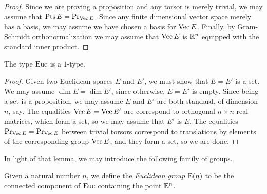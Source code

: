 \begin{proof}
  Since we are proving a proposition and any torsor is merely trivial, we may
  assume that $\operatorname{Pts} E = \mathrm{Pr}_{{\operatorname{Vec} E}}$.  Since any finite dimensional
  vector space merely has a basis, we may assume we have chosen a basis for
  $\operatorname{Vec} E$.  Finally, by Gram-Schmidt orthonormalization we may assume that
  $\operatorname{Vec} E$ is $\mathbb{R}^n$ equipped with the standard inner product.
\end{proof}

\begin{lemma}\label{lem:EuclideanSpace1Type}
  The type $\mathrm{Euc}$ is a $1$-type.
\end{lemma}

\begin{proof}
  Given two Euclidean spaces $E$ and $E'$, we must show that $E=E'$ is a set.
  We may assume $\dim E = \dim E'$, since otherwise, $E=E'$ is empty.  Since
  being a set is a proposition, we may assume $E$ and $E'$ are both standard,
  of dimension $n$, say.  The equalities $\operatorname{Vec} E = \operatorname{Vec} E'$ are
  correspond to orthogonal $n \times n$ real matrices, which form a set, so we
  may assume that $E'$ is $E$.  The equalities $\mathrm{Pr}_{{\operatorname{Vec} E}} =
  \mathrm{Pr}_{{\operatorname{Vec} E}}$ between trivial torsors correspond to translations by
  elements of the corresponding group $\operatorname{Vec} E$, and they form a set, so we
  are done.
\end{proof}

In light of that lemma, we may introduce the following family of groups.

\begin{definition}\label{def:EuclideanGroup}
  Given a natural number $n$, we define the {\em Euclidean group} $\mathrm E(n)$ to be
  the connected component of $\mathrm{Euc}$ containing the point $\mathbb E^n$.
\end{definition}
